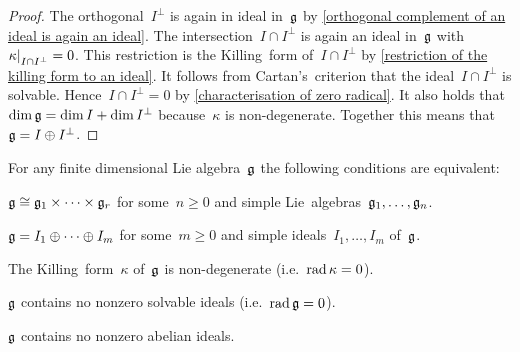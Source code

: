 \begin{proof}
  The orthogonal~$I^\perp$ is again in ideal in~$\mathfrak{g}$ by \cref{orthogonal complement of an ideal is again an ideal}.
  The intersection~$I \cap I^\perp$ is again an ideal in~$\mathfrak{g}$ with~$\restrict{\kappa}{I \cap I^\perp} = 0$.
  This restriction is the Killing~form of~$I \cap I^\perp$ by \cref{restriction of the killing form to an ideal}.
  It follows from Cartan’s~criterion that the ideal~$I \cap I^\perp$ is solvable.
  Hence~$I \cap I^\perp = 0$ by \cref{characterisation of zero radical}.
  It also holds that~$\dim \mathfrak{g} = \dim I + \dim I^\perp$ because~$\kappa$ is non-degenerate.
  Together this means that~$\mathfrak{g} = I \oplus I^\perp$.
\end{proof}


\begin{theorem}
  \label{characterizations of fd semisimple lie algebras}
  For any finite dimensional Lie algebra~$\mathfrak{g}$ the following conditions are equivalent:
  \begin{equivalenceslist}
    \item
    \label{product of simple lie algebras general}
      $\mathfrak{g} \cong \mathfrak{g}_1 \times \dotsb \times \mathfrak{g}_r$ for some~$n \geq 0$ and simple Lie~algebras~$\mathfrak{g}_1, \dotsc, \mathfrak{g}_n$.
    \item
      \label{sum of simple ideals general}
      $\mathfrak{g} = I_1 \oplus \dotsb \oplus I_m$ for some~$m \geq 0$ and simple ideals~$I_1, \dotsc, I_m$ of~$\mathfrak{g}$.
    \item
      \label{killing form is nondegenerate general}
      The Killing~form~$\kappa$ of~$\mathfrak{g}$ is non-degenerate (i.e.~$\operatorname{rad} \kappa = 0$).
    \item
      \label{contains no solvable ideal general}
      $\mathfrak{g}$ contains no nonzero solvable ideals (i.e.~$\operatorname{rad} \mathfrak{g} = 0$).
    \item
      \label{contains no abelian ideal general}
      $\mathfrak{g}$ contains no nonzero abelian ideals.
  \end{equivalenceslist}
\end{theorem}


